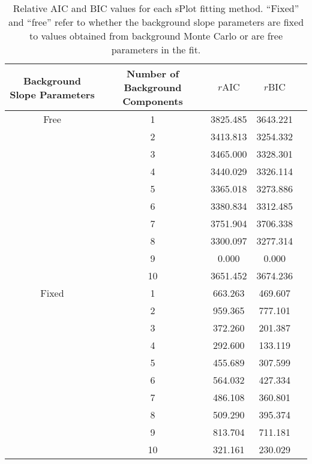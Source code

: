 \begin{table}[ht]
    \begin{center}
        \begin{tabular}{ccccc}\toprule
        Background Slope Parameters & Number of Background Components & $r\text{AIC}$ & $r\text{BIC}$\\\midrule
        Free & 1 & 3825.485 & 3643.221 \\
         & 2 & 3413.813 & 3254.332 \\
         & 3 & 3465.000 & 3328.301 \\
         & 4 & 3440.029 & 3326.114 \\
         & 5 & 3365.018 & 3273.886 \\
         & 6 & 3380.834 & 3312.485 \\
         & 7 & 3751.904 & 3706.338 \\
         & 8 & 3300.097 & 3277.314 \\
         & 9 & 0.000 & 0.000 \\
         & 10 & 3651.452 & 3674.236 \\
        Fixed & 1 & 663.263 & 469.607 \\
         & 2 & 959.365 & 777.101 \\
         & 3 & 372.260 & 201.387 \\
         & 4 & 292.600 & 133.119 \\
         & 5 & 455.689 & 307.599 \\
         & 6 & 564.032 & 427.334 \\
         & 7 & 486.108 & 360.801 \\
         & 8 & 509.290 & 395.374 \\
         & 9 & 813.704 & 711.181 \\
         & 10 & 321.161 & 230.029 \\\bottomrule
        \end{tabular}
        \caption{Relative AIC and BIC values for each sPlot fitting method. ``Fixed'' and ``free'' refer to whether the background slope parameters are fixed to values obtained from background Monte Carlo or are free parameters in the fit.}\label{tab:splot-model-results}
    \end{center}
\end{table}